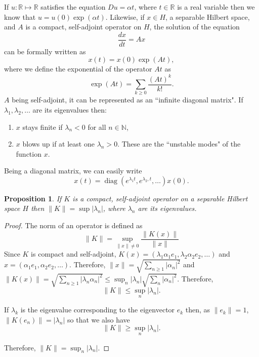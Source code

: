 \documentclass{article}
\theoremstyle{plain}
\numberwithin{thm}{section}
\theoremstyle{plain}
\newtheorem{prop}{Proposition}
\numberwithin{prop}{section}
\theoremstyle{definition}
\numberwithin{defn}{section}
\theoremstyle{remark}
\numberwithin{equation}{section}
\DeclareMathOperator{\diag}{diag}
\begin{document}
If $u: \mathbb{R} \mapsto \mathbb{R}$ satisfies the equation $Du = \alpha t$,
where $t \in \mathbb{R}$ is a real variable then we know that $u = u(0)
\exp(\alpha t)$. Likewise, if $x \in H$, a separable Hilbert space, and $A$
is a compact, self-adjoint operator on $H$, the solution of the equation
\[
\frac{dx}{dt} = Ax
\]
can be formally written as
\[
x(t) = x(0)\exp(At),
\]
where we define the exponential of the operator $At$ as
\begin{equation}\label{s6e1}
\exp(At) = \sum_{k \ge 0}\frac{(At)^k}{k!}.
\end{equation}
$A$ being self-adjoint, it can be represented as an ``infinite diagonal matrix".
If $\lambda_1, \lambda_2, \ldots$ are its eigenvalues then:
\begin{enumerate}
\item $x$ stays finite if $\lambda_n < 0$ for all $n \in \mathbb{N}$,
\item $x$ blows up if at least one $\lambda_n > 0$. These are the ``unstable
modes" of the function $x$.
\end{enumerate}
Being a diagonal matrix, we can easily write
\begin{equation}\label{s6e2}
x(t) = \diag(e^{\lambda_1 t}, e^{\lambda_2, t}, \ldots) x(0).
\end{equation}

\begin{prop}\label{s6p1}
If $K$ is a compact, self-adjoint operator on a separable Hilbert space $H$
then $\lVert K \rVert = \sup |\lambda_n|$, where $\lambda_n$ are its eigenvalues.
\end{prop}
\begin{proof}
The norm of an operator is defined as 
\[
\lVert K \rVert = \sup_{\lVert x \rVert \ne 0}\frac{\lVert K(x) \rVert}{\lVert
x \rVert}
\]
Since $K$ is compact and self-adjoint, $K(x) = (\lambda_1 \alpha_1 e_1, 
\lambda_2 \alpha_2 e_2, \ldots)$ and $x = (\alpha_1 e_1, \alpha_2 e_2, \ldots)$.
Therefore, $\lVert x \rVert = \sqrt{\sum_{n \ge 1}|\alpha_n|^2}$ and 
$\lVert K(x) \rVert = \sqrt{\sum_{n \ge 1}|\lambda_n \alpha_n|^2} \le 
\sup_n |\lambda_n|\sqrt{\sum_n |\alpha_n|^2}$. Therefore,
\[
\lVert K \rVert \le \sup_n |\lambda_n|.
\]

If $\lambda_k$ is the eigenvalue corresponding to the eigenvector $e_k$ then,
as $\lVert e_k \rVert = 1$, $\lVert K(e_n) \rVert = |\lambda_n|$ so that we 
also have
\[
\lVert K \rVert \ge \sup_n |\lambda_n|.
\]

Therefore, $\lVert K \rVert = \sup_n |\lambda_n|$.
\end{proof}
\end{document}
